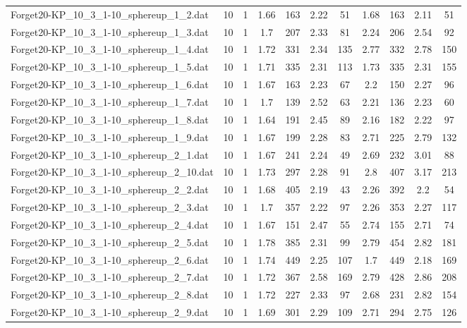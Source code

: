 \begin{table}[!ht]
\begin{tabular}{lcccccccccc}
Forget20-KP\_10\_3\_1-10\_sphereup\_1\_2.dat & 10 & 1 & 1.66 & 163 & 2.22 & 51 & 1.68 & 163 & 2.11 & 51 \\
Forget20-KP\_10\_3\_1-10\_sphereup\_1\_3.dat & 10 & 1 & 1.7 & 207 & 2.33 & 81 & 2.24 & 206 & 2.54 & 92 \\
Forget20-KP\_10\_3\_1-10\_sphereup\_1\_4.dat & 10 & 1 & 1.72 & 331 & 2.34 & 135 & 2.77 & 332 & 2.78 & 150 \\
Forget20-KP\_10\_3\_1-10\_sphereup\_1\_5.dat & 10 & 1 & 1.71 & 335 & 2.31 & 113 & 1.73 & 335 & 2.31 & 155 \\
Forget20-KP\_10\_3\_1-10\_sphereup\_1\_6.dat & 10 & 1 & 1.67 & 163 & 2.23 & 67 & 2.2 & 150 & 2.27 & 96 \\
Forget20-KP\_10\_3\_1-10\_sphereup\_1\_7.dat & 10 & 1 & 1.7 & 139 & 2.52 & 63 & 2.21 & 136 & 2.23 & 60 \\
Forget20-KP\_10\_3\_1-10\_sphereup\_1\_8.dat & 10 & 1 & 1.64 & 191 & 2.45 & 89 & 2.16 & 182 & 2.22 & 97 \\
Forget20-KP\_10\_3\_1-10\_sphereup\_1\_9.dat & 10 & 1 & 1.67 & 199 & 2.28 & 83 & 2.71 & 225 & 2.79 & 132 \\
Forget20-KP\_10\_3\_1-10\_sphereup\_2\_1.dat & 10 & 1 & 1.67 & 241 & 2.24 & 49 & 2.69 & 232 & 3.01 & 88 \\
Forget20-KP\_10\_3\_1-10\_sphereup\_2\_10.dat & 10 & 1 & 1.73 & 297 & 2.28 & 91 & 2.8 & 407 & 3.17 & 213 \\
Forget20-KP\_10\_3\_1-10\_sphereup\_2\_2.dat & 10 & 1 & 1.68 & 405 & 2.19 & 43 & 2.26 & 392 & 2.2 & 54 \\
Forget20-KP\_10\_3\_1-10\_sphereup\_2\_3.dat & 10 & 1 & 1.7 & 357 & 2.22 & 97 & 2.26 & 353 & 2.27 & 117 \\
Forget20-KP\_10\_3\_1-10\_sphereup\_2\_4.dat & 10 & 1 & 1.67 & 151 & 2.47 & 55 & 2.74 & 155 & 2.71 & 74 \\
Forget20-KP\_10\_3\_1-10\_sphereup\_2\_5.dat & 10 & 1 & 1.78 & 385 & 2.31 & 99 & 2.79 & 454 & 2.82 & 181 \\
Forget20-KP\_10\_3\_1-10\_sphereup\_2\_6.dat & 10 & 1 & 1.74 & 449 & 2.25 & 107 & 1.7 & 449 & 2.18 & 169 \\
Forget20-KP\_10\_3\_1-10\_sphereup\_2\_7.dat & 10 & 1 & 1.72 & 367 & 2.58 & 169 & 2.79 & 428 & 2.86 & 208 \\
Forget20-KP\_10\_3\_1-10\_sphereup\_2\_8.dat & 10 & 1 & 1.72 & 227 & 2.33 & 97 & 2.68 & 231 & 2.82 & 154 \\
Forget20-KP\_10\_3\_1-10\_sphereup\_2\_9.dat & 10 & 1 & 1.69 & 301 & 2.29 & 109 & 2.71 & 294 & 2.75 & 126 \\

\end{tabular}
\end{table}
